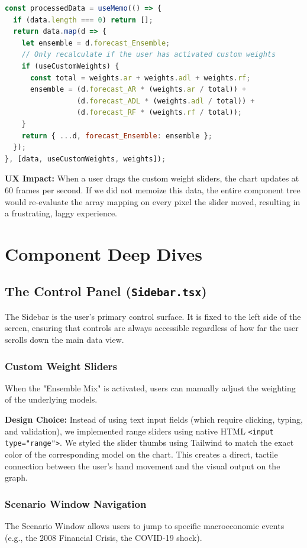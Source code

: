 \documentclass[12pt]{article}
\begin{document}
\begin{lstlisting}[language=JavaScript, caption=Dynamic Ensemble Calculation]
const processedData = useMemo(() => {
  if (data.length === 0) return [];
  return data.map(d => {
    let ensemble = d.forecast_Ensemble;
    // Only recalculate if the user has activated custom weights
    if (useCustomWeights) {
      const total = weights.ar + weights.adl + weights.rf;
      ensemble = (d.forecast_AR * (weights.ar / total)) + 
                 (d.forecast_ADL * (weights.adl / total)) + 
                 (d.forecast_RF * (weights.rf / total));
    }
    return { ...d, forecast_Ensemble: ensemble };
  });
}, [data, useCustomWeights, weights]);
\end{lstlisting}

\textbf{UX Impact:} When a user drags the custom weight sliders, the chart updates at 60 frames per second. If we did not memoize this data, the entire component tree would re-evaluate the array mapping on every pixel the slider moved, resulting in a frustrating, laggy experience.

\section{Component Deep Dives}

\subsection{The Control Panel (\texttt{Sidebar.tsx})}
The Sidebar is the user's primary control surface. It is fixed to the left side of the screen, ensuring that controls are always accessible regardless of how far the user scrolls down the main data view.

\subsubsection{Custom Weight Sliders}
When the "Ensemble Mix" is activated, users can manually adjust the weighting of the underlying models. 

\textbf{Design Choice:} Instead of using text input fields (which require clicking, typing, and validation), we implemented range sliders using native HTML \texttt{<input type="range">}. We styled the slider thumbs using Tailwind to match the exact color of the corresponding model on the chart. This creates a direct, tactile connection between the user's hand movement and the visual output on the graph.

\subsubsection{Scenario Window Navigation}
The Scenario Window allows users to jump to specific macroeconomic events (e.g., the 2008 Financial Crisis, the COVID-19 shock). 
\end{document}
